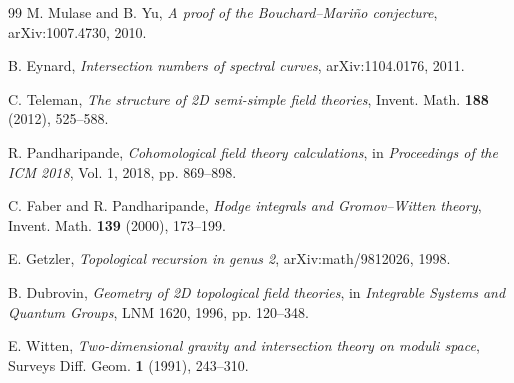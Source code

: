 \begin{thebibliography}{99}
 M. Mulase and B. Yu,
\textit{A proof of the Bouchard--Mariño conjecture},
arXiv:1007.4730, 2010.

 B. Eynard,
\textit{Intersection numbers of spectral curves},
arXiv:1104.0176, 2011.

 C. Teleman,
\textit{The structure of 2D semi-simple field theories},
Invent. Math. \textbf{188} (2012), 525--588.

 R. Pandharipande,
\textit{Cohomological field theory calculations},
in \emph{Proceedings of the ICM 2018}, Vol. 1, 2018, pp. 869--898.

 C. Faber and R. Pandharipande,
\textit{Hodge integrals and Gromov--Witten theory},
Invent. Math. \textbf{139} (2000), 173--199.

 E. Getzler,
\textit{Topological recursion in genus 2},
arXiv:math/9812026, 1998.

 B. Dubrovin,
\textit{Geometry of 2D topological field theories},
in \emph{Integrable Systems and Quantum Groups}, LNM 1620, 1996, pp. 120--348.

 E. Witten,
\textit{Two-dimensional gravity and intersection theory on moduli space},
Surveys Diff. Geom. \textbf{1} (1991), 243--310.

\end{thebibliography}


